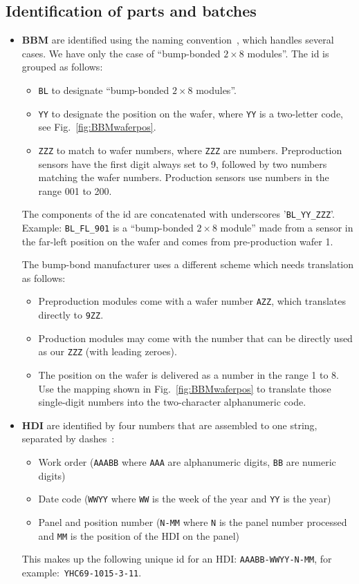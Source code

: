 \documentclass[12pt]{unlsilabsop}
\begin{document}
\subsection{Identification of parts and batches}
\begin{itemize}
    \item \textbf{BBM} are identified using the naming convention~\cite{BBMnaming}, which handles several cases. We have only the case of ``bump-bonded $2\times8$ modules''. The id is grouped as follows:
        \begin{itemize}
        \item \texttt{BL} to designate ``bump-bonded $2\times8$ modules''.
        \item \texttt{YY} to designate the position on the wafer, where \texttt{YY} is a two-letter code, see Fig.~\ref{fig:BBMwaferpos}.
        \item \texttt{ZZZ} to match to wafer numbers, where \texttt{ZZZ} are numbers. Preproduction sensors have the first digit always set to 9, followed by two numbers matching the wafer numbers. Production sensors use numbers in the range 001 to 200.
        \end{itemize}
    The components of the id are concatenated with underscores '\texttt{BL\_YY\_ZZZ}'.
    Example: \texttt{BL\_FL\_901} is a ``bump-bonded $2\times8$ module'' made from a sensor in the far-left position on the wafer and comes from pre-production wafer 1.

    The bump-bond manufacturer uses a different scheme which needs translation as follows:
        \begin{itemize}
        \item Preproduction modules come with a wafer number \texttt{AZZ}, which translates directly to \texttt{9ZZ}.
        \item Production modules may come with the number that can be directly used as our \texttt{ZZZ} (with leading zeroes).
        \item The position on the wafer is delivered as a number in the range 1 to 8. Use the mapping shown in Fig.~\ref{fig:BBMwaferpos} to translate those single-digit numbers into the two-character alphanumeric code.
        \end{itemize}

    \item \textbf{HDI} are identified by four numbers that are assembled to one string, separated by dashes~\cite{HDInaming}:
        \begin{itemize}
        \item Work order (\texttt{AAABB} where \texttt{AAA} are alphanumeric digits, \texttt{BB} are numeric digits)
        \item Date code (\texttt{WWYY} where \texttt{WW} is the week of the year and \texttt{YY} is the year)
        \item Panel and position number (\texttt{N-MM} where \texttt{N} is the panel number processed and \texttt{MM} is the position of the HDI on the panel)
        \end{itemize}
    This makes up the following unique id for an HDI: \texttt{AAABB-WWYY-N-MM}, for example:~\texttt{YHC69-1015-3-11}.


\end{itemize}
\end{document}
